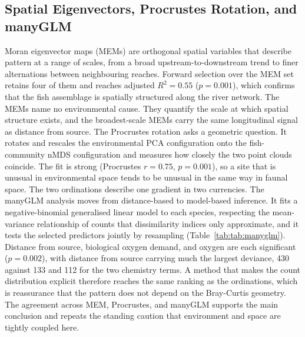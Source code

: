 \documentclass[11pt]{article}
\begin{document}
\subsection{Spatial Eigenvectors, Procrustes Rotation, and manyGLM}
Moran eigenvector maps (MEMs) are orthogonal spatial variables that describe pattern at a range of scales, from a broad upstream-to-downstream trend to finer alternations between neighbouring reaches. Forward selection over the MEM set retains four of them and reaches adjusted $R^2 = 0.55$ ($p = 0.001$), which confirms that the fish assemblage is spatially structured along the river network. The MEMs name no environmental cause. They quantify the scale at which spatial structure exists, and the broadest-scale MEMs carry the same longitudinal signal as distance from source.
The Procrustes rotation asks a geometric question. It rotates and rescales the environmental PCA configuration onto the fish-community nMDS configuration and measures how closely the two point clouds coincide. The fit is strong (Procrustes $r = 0.75$, $p = 0.001$), so a site that is unusual in environmental space tends to be unusual in the same way in faunal space. The two ordinations describe one gradient in two currencies.
The manyGLM analysis moves from distance-based to model-based inference. It fits a negative-binomial generalised linear model to each species, respecting the mean-variance relationship of counts that dissimilarity indices only approximate, and it tests the selected predictors jointly by resampling (Table~\ref{tab:tab:manyglm}). Distance from source, biological oxygen demand, and oxygen are each significant ($p = 0.002$), with distance from source carrying much the largest deviance, 430 against 133 and 112 for the two chemistry terms. A method that makes the count distribution explicit therefore reaches the same ranking as the ordinations, which is reassurance that the pattern does not depend on the Bray-Curtis geometry. The agreement across MEM, Procrustes, and manyGLM supports the main conclusion and repeats the standing caution that environment and space are tightly coupled here.
\begin{table}[!h]
\centering
\caption{\label{tab:tab:manyglm}Negative-binomial manyGLM multivariate tests for the db-RDA selected predictors.}
\centering
{}
\end{table}
\end{document}
